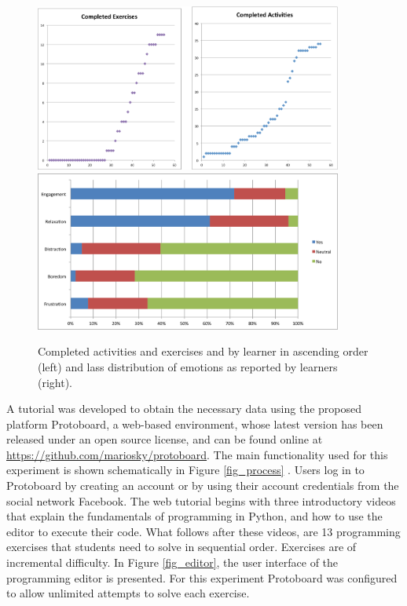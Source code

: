 \documentclass[a4paper,twoside]{article}
\begin{document}
\begin{figure}[!t] 
\centering 
\includegraphics[width=0.9\textwidth]{Completed.png} 
\includegraphics[width=0.9\textwidth]{classDist.png} 
\caption{Completed activities and exercises and by learner in ascending order (left) and lass distribution of emotions as reported by learners (right).}
\label{fig_completed} 
\end{figure}

A tutorial was developed to
obtain the necessary data using the proposed platform Protoboard, a web-based environment,
whose latest version has been released under an open source license,
and can be found online at \url{https://github.com/mariosky/protoboard}.
The main functionality  used for this experiment is
shown schematically in Figure \ref{fig_process} . %
Users log in to 
Protoboard  by creating an account or by using their account credentials from the
social network Facebook. The web tutorial begins with three introductory videos that explain
the fundamentals of programming in Python, and how to use the editor to
execute their code. What follows after these videos, are 13 programming
exercises that students need to solve in sequential order. Exercises are of
incremental difficulty.  In Figure \ref{fig_editor}, 
the user interface of the programming editor is
presented.
For this experiment Protoboard was configured to allow unlimited
attempts to solve each exercise. 
\end{document}
